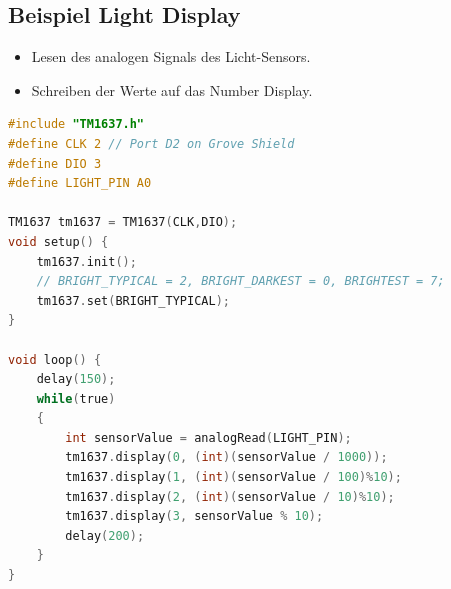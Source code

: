 \subsection{Beispiel Light Display}
\begin{itemize}
	\item Lesen des analogen Signals des Licht-Sensors.
	\item Schreiben der Werte auf das Number Display.
\end{itemize}

\begin{lstlisting}[language=C, caption=Light Display]
#include "TM1637.h"
#define CLK 2 // Port D2 on Grove Shield
#define DIO 3
#define LIGHT_PIN A0

TM1637 tm1637 = TM1637(CLK,DIO);
void setup() {
	tm1637.init();
	// BRIGHT_TYPICAL = 2, BRIGHT_DARKEST = 0, BRIGHTEST = 7;
	tm1637.set(BRIGHT_TYPICAL);
}

void loop() {
	delay(150);
	while(true)
	{
		int sensorValue = analogRead(LIGHT_PIN);
		tm1637.display(0, (int)(sensorValue / 1000));
		tm1637.display(1, (int)(sensorValue / 100)%10); 
		tm1637.display(2, (int)(sensorValue / 10)%10);
		tm1637.display(3, sensorValue % 10);
		delay(200);
	}
}
\end{lstlisting}

